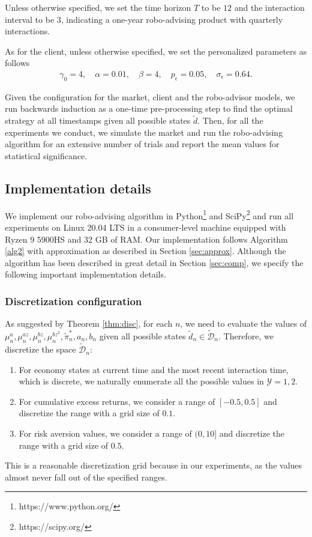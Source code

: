 Unless otherwise specified, we set the time horizon $T$ to be $12$ and the interaction interval to be $3$, indicating a one-year robo-advising product with quarterly interactions.

As for the client, unless otherwise specified, we set the personalized parameters as follows\begin{align*}
    \gamma_0=4,\quad \alpha=0.01,\quad \beta=4,\quad p_\epsilon=0.05,\quad \sigma_\epsilon=0.64.
\end{align*}

Given the configuration for the market, client and the robo-advisor models, we run backwards induction as a one-time pre-processing step to find the optimal strategy at all timestamps given all possible states $\tilde d$. Then, for all the experiments we conduct, we simulate the market and run the robo-advising algorithm for an extensive number of trials and report the mean values for statistical significance.

\subsection{Implementation details}
We implement our robo-advising algorithm in Python\footnote{https://www.python.org/} and SciPy\footnote{https://scipy.org/} and run all experiments on Linux 20.04 LTS in a consumer-level machine equipped with Ryzen 9 5900HS and 32 GB of RAM. Our implementation follows Algorithm \ref{alg2} with approximation as described in Section \ref{sec:approx}. Although the algorithm has been described in great detail in Section \ref{sec:comp}, we specify the following important implementation details.

\subsubsection{Discretization configuration}
As suggested by Theorem \ref{thm:disc}, for each $n$, we need to evaluate the values of $\mu_n^a,\mu_n^{az},\mu_n^{bz},\mu_n^{bz^2},\tilde\pi_n^*,\allowbreak a_n,b_n$ given all possible states $\tilde d_n\in\tilde{\mathcal D}_n$. Therefore, we discretize the space $\tilde{\mathcal D}_n$:\begin{enumerate}
    \item For economy states at current time and the most recent interaction time, which is discrete, we naturally enumerate all the possible values in $\mathcal Y={1,2}$.
    \item For cumulative excess returns, we consider a range of $[-0.5,0.5]$ and discretize the range with a grid size of $0.1$.
    \item For risk aversion values, we consider a range of $(0,10]$ and discretize the range with a grid size of $0.5$.
\end{enumerate} This is a reasonable discretization grid because in our experiments, as the values almost never fall out of the specified ranges.

